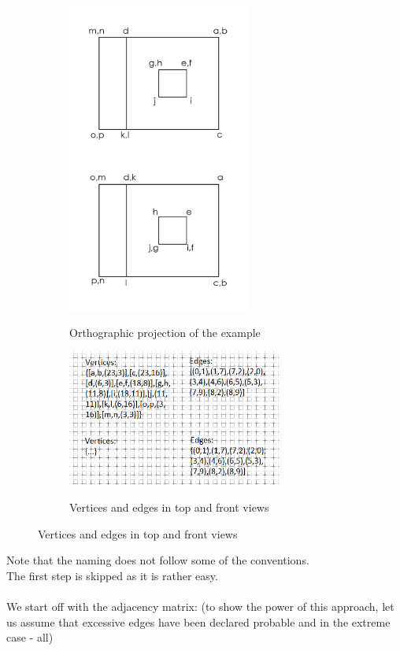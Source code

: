 \documentclass[
11pt, %
english, %
singlespacing, %
headsepline, %
]{MastersDoctoralThesis} %
\begin{document}
\begin{figure}[H]
\begin{subfigure}{0.5\textwidth}
\includegraphics[width = 170pt]{ortho2} \\
\caption{Orthographic projection of the example}
\end{subfigure}
\begin{subfigure}{0.5\textwidth}
\includegraphics[width = 200pt]{vande1} \\
\caption{Vertices and edges in top and front views}
\end{subfigure}
\end{figure}
Note that the naming does not follow some of the conventions.\\
The first step is skipped as it is rather easy.\\ \\
We start off with the adjacency matrix: (to show the power of this approach, let us assume that excessive edges have been declared probable and in the extreme case - all)\\ \\
\end{document}
